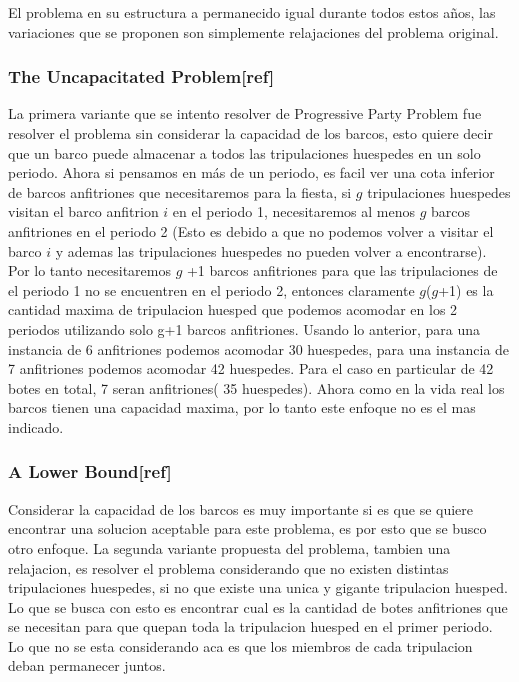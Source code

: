 \documentclass[spanish, fleqn]{article}
\begin{document}
El problema en su estructura a permanecido igual durante todos estos años, las variaciones que se proponen son simplemente relajaciones del problema original.

\subsubsection*{The Uncapacitated Problem[ref]}

 La primera variante que se intento resolver de Progressive Party Problem fue resolver el problema sin considerar la capacidad de los barcos, esto quiere decir que un barco puede almacenar a todos las tripulaciones huespedes en un solo periodo. Ahora si pensamos en más de un periodo, es facil ver una cota inferior de barcos anfitriones que necesitaremos para la fiesta, si $\mathit{g}$ tripulaciones huespedes visitan el barco anfitrion $\mathit{i}$ en el periodo 1, necesitaremos al menos $\mathit{g}$ barcos anfitriones en el periodo 2 (Esto es debido a que no podemos volver a visitar el barco $\mathit{i}$ y ademas las tripulaciones huespedes no pueden volver a encontrarse). Por lo tanto necesitaremos $\mathit{g}$ +1 barcos anfitriones para que las tripulaciones de el periodo 1 no se encuentren en el periodo 2, entonces claramente $\mathit{g}$($\mathit{g}$+1) es la cantidad maxima de tripulacion huesped que podemos acomodar en los 2 periodos utilizando solo g+1 barcos anfitriones. Usando lo anterior, para una instancia de 6 anfitriones podemos acomodar 30 huespedes, para una instancia de 7 anfitriones podemos acomodar 42 huespedes. Para el caso en particular de 42 botes en total, 7 seran anfitriones( 35 huespedes). Ahora como en la vida real los barcos tienen una capacidad maxima, por lo tanto este enfoque no es el mas indicado.
 
 \newpage
 
\subsubsection*{A Lower Bound[ref]}

Considerar la capacidad de los barcos es muy importante si es que se quiere encontrar una solucion aceptable para este problema, es por esto que se busco otro enfoque. La segunda variante propuesta del problema, tambien una relajacion, es resolver el problema considerando que no existen distintas tripulaciones huespedes, si no que existe una unica y gigante tripulacion huesped. Lo que se busca con esto es encontrar cual es la cantidad de botes anfitriones que se necesitan para que quepan toda la tripulacion huesped en el primer periodo. Lo que no se esta considerando aca es que los miembros de cada  tripulacion deban permanecer juntos.
 
\end{document}
